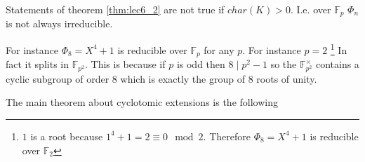 \begin{remark}
  Statements of theorem \ref{thm:lec6_2} are not true if $char(K) >
  0$. I.e. over $\mathbb{F}_p$ $\Phi_n$ is not always irreducible.

  For instance $\Phi_8 = X^4 + 1$ is reducible over $\mathbb{F}_p$ for
  any $p$. For instance $p = 2$
  \footnote{
    $1$ is a root because $1^4 + 1 = 2 \equiv 0 \mod 2$. Therefore
    $\Phi_8 = X^4 + 1$ is reducible over $\mathbb{F}_2$
  }
  In fact it splits in $\mathbb{F}_{p^2}$.
  This is because if $p$ is odd then $8\mid p^2-1$ so the
  $\mathbb{F}_{p^2}^\times$ contains a cyclic subgroup of order 8 which is
  exactly the group of 8 roots of unity.
\end{remark}

The main theorem about cyclotomic extensions is the following
